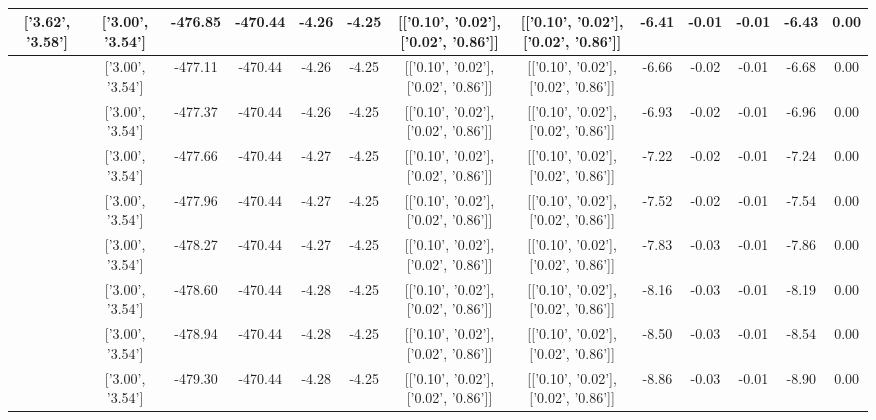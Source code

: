 \begin{table}[htbp]
\begin{adjustbox}{angle=90}
\begin{tabular}{|c|c|c|c|c|c|c|c|c|c|c|c|c|}
 ['3.62', '3.58'] & ['3.00', '3.54'] & -476.85 & -470.44 & -4.26 & -4.25 & [['0.10', '0.02'], ['0.02', '0.86']] & [['0.10', '0.02'], ['0.02', '0.86']] & -6.41 & -0.01 & -0.01 & -6.43 & 0.00\\ \hline
 ['3.66', '3.58'] & ['3.00', '3.54'] & -477.11 & -470.44 & -4.26 & -4.25 & [['0.10', '0.02'], ['0.02', '0.86']] & [['0.10', '0.02'], ['0.02', '0.86']] & -6.66 & -0.02 & -0.01 & -6.68 & 0.00\\ \hline
 ['3.70', '3.59'] & ['3.00', '3.54'] & -477.37 & -470.44 & -4.26 & -4.25 & [['0.10', '0.02'], ['0.02', '0.86']] & [['0.10', '0.02'], ['0.02', '0.86']] & -6.93 & -0.02 & -0.01 & -6.96 & 0.00\\ \hline
 ['3.74', '3.59'] & ['3.00', '3.54'] & -477.66 & -470.44 & -4.27 & -4.25 & [['0.10', '0.02'], ['0.02', '0.86']] & [['0.10', '0.02'], ['0.02', '0.86']] & -7.22 & -0.02 & -0.01 & -7.24 & 0.00\\ \hline
 ['3.78', '3.59'] & ['3.00', '3.54'] & -477.96 & -470.44 & -4.27 & -4.25 & [['0.10', '0.02'], ['0.02', '0.86']] & [['0.10', '0.02'], ['0.02', '0.86']] & -7.52 & -0.02 & -0.01 & -7.54 & 0.00\\ \hline
 ['3.81', '3.59'] & ['3.00', '3.54'] & -478.27 & -470.44 & -4.27 & -4.25 & [['0.10', '0.02'], ['0.02', '0.86']] & [['0.10', '0.02'], ['0.02', '0.86']] & -7.83 & -0.03 & -0.01 & -7.86 & 0.00\\ \hline
 ['3.85', '3.60'] & ['3.00', '3.54'] & -478.60 & -470.44 & -4.28 & -4.25 & [['0.10', '0.02'], ['0.02', '0.86']] & [['0.10', '0.02'], ['0.02', '0.86']] & -8.16 & -0.03 & -0.01 & -8.19 & 0.00\\ \hline
 ['3.89', '3.60'] & ['3.00', '3.54'] & -478.94 & -470.44 & -4.28 & -4.25 & [['0.10', '0.02'], ['0.02', '0.86']] & [['0.10', '0.02'], ['0.02', '0.86']] & -8.50 & -0.03 & -0.01 & -8.54 & 0.00\\ \hline
 ['3.93', '3.60'] & ['3.00', '3.54'] & -479.30 & -470.44 & -4.28 & -4.25 & [['0.10', '0.02'], ['0.02', '0.86']] & [['0.10', '0.02'], ['0.02', '0.86']] & -8.86 & -0.03 & -0.01 & -8.90 & 0.00\\ \hline
            \end{tabular}
        \end{adjustbox}
        \caption{}
        \label{}
    \end{table}
    